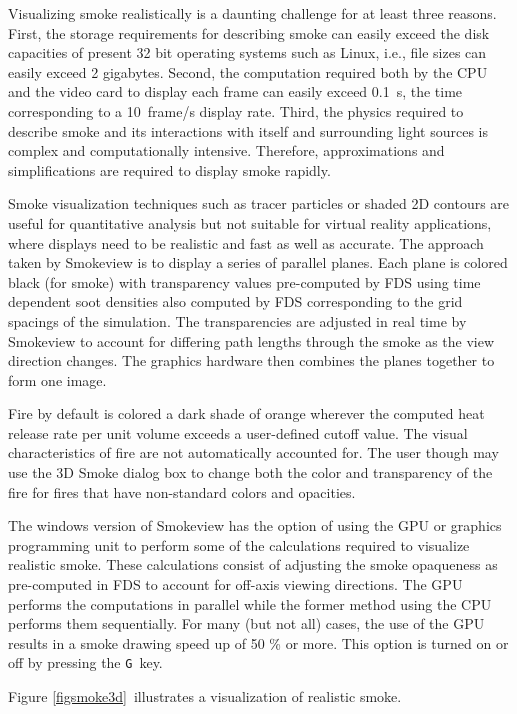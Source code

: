 \documentclass[11pt,twoside]{book}
\begin{document}
Visualizing smoke realistically is a daunting challenge for at
least three reasons. First, the storage requirements for
describing smoke can easily exceed the disk capacities of present
32 bit operating systems such as Linux, i.e., file sizes can easily
exceed 2 gigabytes. Second, the computation required both by the
CPU and the video card to display each frame can easily exceed
0.1~s, the time corresponding to a 10~frame/s display rate. Third,
the physics required to describe smoke and its interactions with
itself and surrounding light sources is complex and
computationally intensive. Therefore, approximations and
simplifications are required to display smoke rapidly.

Smoke visualization techniques such as tracer particles or shaded
2D contours are useful for quantitative analysis but not suitable
for virtual reality applications, where displays need to be
realistic and fast as well as accurate. The approach taken by
Smokeview is to display a series of parallel planes.  Each plane
is colored black (for smoke) with transparency values pre-computed
by FDS using time dependent soot densities also computed by FDS
corresponding to the grid spacings of the simulation. The
transparencies are adjusted in real time by Smokeview to account
for differing path lengths through the smoke as the view direction
changes. The graphics hardware then combines the planes together
to form one image.

Fire by default is colored a dark shade of orange wherever the
computed heat release rate per unit volume exceeds a user-defined
cutoff value.  The visual characteristics of fire are not
automatically accounted for.  The user though may use the 3D
Smoke dialog box to change both the color and transparency of
the fire for fires that have non-standard colors and opacities.

The windows version of Smokeview has the option of using the GPU
or graphics programming unit to perform some of the calculations
required to visualize realistic smoke.  These calculations consist
of adjusting the smoke opaqueness as pre-computed in FDS to
account for off-axis viewing directions. The GPU performs the
computations in parallel while the former method using the CPU
performs them sequentially.  For many (but not all) cases, the use
of the GPU results in a smoke drawing speed up of 50 \% or more.
This option is turned on or off by pressing the {\tt G}\ key.


Figure \ref{figsmoke3d}\ illustrates a visualization of realistic
smoke.
\end{document}
